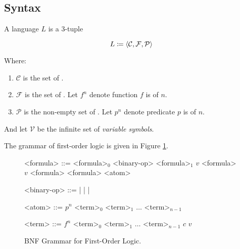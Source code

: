 \subsection{Syntax}

\begin{definition}
    A  language $L$ is a 3-tuple

    \begin{equation}
        L \coloneqq \langle {\mathcal{C}, \mathcal{F}, \mathcal{P}} \rangle
    \end{equation}

    Where:

    \begin{enumerate}
        \item $\mathcal{C}$ is the set of .
        \item $\mathcal{F}$ is the set of .
            Let $f^n$ denote function $f$ is of  $n$.
        \item $\mathcal{P}$ is the non-empty set of .
            Let $p^n$ denote predicate $p$ is of  $n$.
    \end{enumerate}
    
    And let $\mathcal{V}$ be the infinite set of \textit{variable symbols}.
\end{definition}

The grammar of first-order logic is given in Figure 
\ref{fig:first_order_logic_bnf}.

\begin{figure}[H]
    \centering
    \begin{grammar}
    <formula> ::= \lit{$($} <formula>$_0$ <binary-op> <formula>$_1$ \lit{$)$}
        \alt \lit{$\Forall$} $v$ \lit{$\colon$} <formula>
            \quad{}
        \alt \lit{$\Exists$} $v$ \lit{$\colon$} <formula>
            \quad{}
        \alt \lit{$\neg$} <formula>
        \alt <atom>
    
    <binary-op> ::= \lit{$\land$} | \lit{$\lor$} | \lit{$\to$} | \lit{$\Iff$}
    
    <atom> ::= $p^n$ \lit{$($} <term>$_0$ \lit{,} <term>$_1$ \lit{,} 
        $\ldots$ \lit{,} <term>$_{n-1}$ \lit{$)$}
            \quad{}
    
    <term> ::= $f^n$ \lit{$($} <term>$_0$ \lit{,} <term>$_1$ \lit{,} 
            $\ldots$ \lit{,} <term>$_{n-1}$ \lit{$)$}
                \quad{}
        \alt $c$ \quad{}
        \alt $v$ \quad{}
    \end{grammar}
    \caption{BNF Grammar for First-Order Logic.}
    \label{fig:first_order_logic_bnf}
\end{figure}


